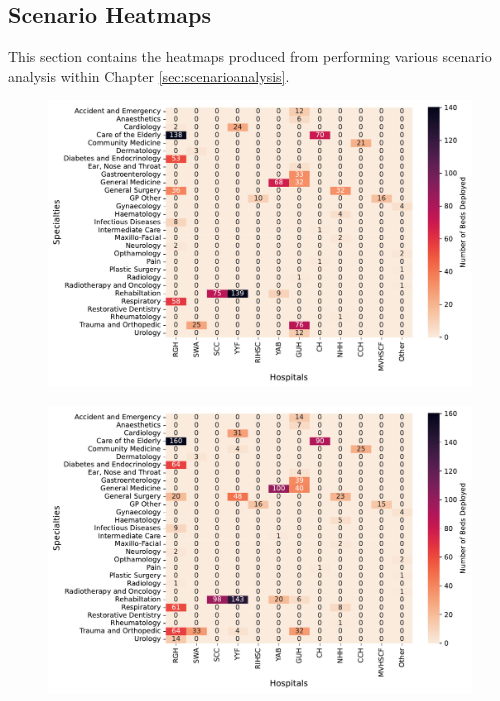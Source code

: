 \documentclass[thesis.tex]{subfiles}
\begin{document}
\begin{landscape}
\section{Scenario Heatmaps}
This section contains the heatmaps produced from performing various scenario analysis within Chapter \ref{sec:scenarioanalysis}.

    

\begin{figure}[h!]
\centering
\begin{minipage}{0.4\linewidth}
  \centering
  \includegraphics[scale=0.4]{Figures - Heatmaps/Fig45.pdf}
  \label{fig:dets1}
\end{minipage}%
\begin{minipage}{0.4\linewidth}
  \centering
  \includegraphics[scale=0.4]{Figures - Heatmaps/Fig46.pdf}  
  \label{fig:stocs2}
\end{minipage}
\end{figure}


\end{landscape}
\end{document}
